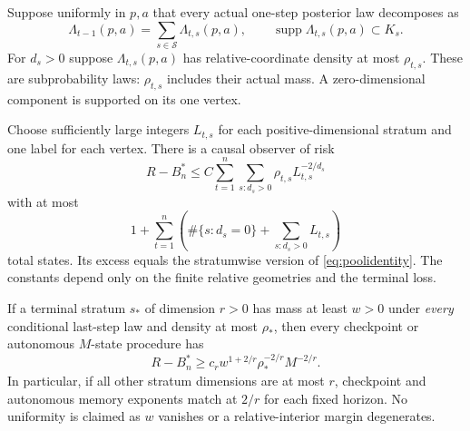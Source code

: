 \begin{theorem}\label{thm:strata}
Suppose uniformly in $p,a$ that every actual one-step posterior law decomposes as
\begin{equation}\label{eq:stratumlaw}
 \Lambda_{t-1}(p,a)=\sum_{s\in\mathcal S}\Lambda_{t,s}(p,a),
 \qquad \operatorname{supp}\Lambda_{t,s}(p,a)\subset K_s.
\end{equation}
For $d_s>0$ suppose $\Lambda_{t,s}(p,a)$ has relative-coordinate density at most $\rho_{t,s}$. These are subprobability laws: $\rho_{t,s}$ includes their actual mass. A zero-dimensional component is supported on its one vertex.

Choose sufficiently large integers $L_{t,s}$ for each positive-dimensional stratum and one label for each vertex. There is a causal observer of risk
\begin{equation}\label{eq:stratifiedupper}
 R-B_n^*\le C\sum_{t=1}^n\sum_{s:d_s>0}\rho_{t,s}L_{t,s}^{-2/d_s}
\end{equation}
with at most
\begin{equation}\label{eq:stratumstates}
 1+\sum_{t=1}^n\left(\#\{s:d_s=0\}+\sum_{s:d_s>0}L_{t,s}\right)
\end{equation}
total states. Its excess equals the stratumwise version of \eqref{eq:poolidentity}. The constants depend only on the finite relative geometries and the terminal loss.

If a terminal stratum $s_*$ of dimension $r>0$ has mass at least $w>0$ under \emph{every} conditional last-step law and density at most $\rho_*$, then every checkpoint or autonomous $M$-state procedure has
\begin{equation}\label{eq:stratumlower}
 R-B_n^*\ge c_r w^{1+2/r}\rho_*^{-2/r}M^{-2/r}.
\end{equation}
In particular, if all other stratum dimensions are at most $r$, checkpoint and autonomous memory exponents match at $2/r$ for each fixed horizon. No uniformity is claimed as $w$ vanishes or a relative-interior margin degenerates.
\end{theorem}

